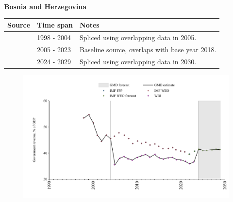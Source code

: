 \documentclass[12pt,a4paper,landscape]{article}
\begin{document}
\begin{adjustbox}{max totalsize={\paperwidth}{\paperheight},center}
\begin{minipage}[t][\textheight][t]{\textwidth}
\vspace*{0.5cm}
{}
\begin{center}
{\Large\bfseries Bosnia and Herzegovina}
\end{center}
\vspace{0.5cm}
\begin{table}[H]
\centering
\small
\begin{tabular}{|l|l|l|}
\hline
\textbf{Source} & \textbf{Time span} & \textbf{Notes} \\
\hline
\rowcolor{white}\cite{IMF_WEO}& 1998 - 2004 &Spliced using overlapping data in 2005.\\
\rowcolor{lightgray}\cite{WDI}& 2005 - 2023 &Baseline source, overlaps with base year 2018.\\
\rowcolor{white}\cite{IMF_WEO_forecast}& 2024 - 2029 &Spliced using overlapping data in 2030.\\
\hline
\end{tabular}
\end{table}
\begin{figure}[H]
\centering
\includegraphics[width=\textwidth,height=0.6\textheight,keepaspectratio]{graphs/BIH_govrev_GDP.pdf}
\end{figure}
\end{minipage}
\end{adjustbox}
\end{document}

